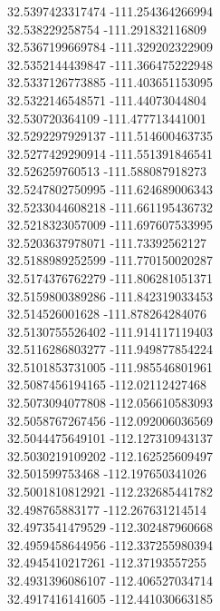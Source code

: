 {32.5397423317474	-111.254364266994\\
32.538229258754	-111.291832116809\\
32.5367199669784	-111.329202322909\\
32.5352144439847	-111.366475222948\\
32.5337126773885	-111.403651153095\\
32.5322146548571	-111.44073044804\\
32.530720364109	-111.477713441001\\
32.5292297929137	-111.514600463735\\
32.5277429290914	-111.551391846541\\
32.526259760513	-111.588087918273\\
32.5247802750995	-111.624689006343\\
32.5233044608218	-111.661195436732\\
32.5218323057009	-111.697607533995\\
32.5203637978071	-111.73392562127\\
32.5188989252599	-111.770150020287\\
32.5174376762279	-111.806281051371\\
32.5159800389286	-111.842319033453\\
32.514526001628	-111.878264284076\\
32.5130755526402	-111.914117119403\\
32.5116286803277	-111.949877854224\\
32.5101853731005	-111.985546801961\\
32.5087456194165	-112.02112427468\\
32.5073094077808	-112.056610583093\\
32.5058767267456	-112.092006036569\\
32.5044475649101	-112.127310943137\\
32.5030219109202	-112.162525609497\\
32.501599753468	-112.197650341026\\
32.5001810812921	-112.232685441782\\
32.498765883177	-112.267631214514\\
32.4973541479529	-112.302487960668\\
32.4959458644956	-112.337255980394\\
32.4945410217261	-112.37193557255\\
32.4931396086107	-112.406527034714\\
32.4917416141605	-112.441030663185\\
}
